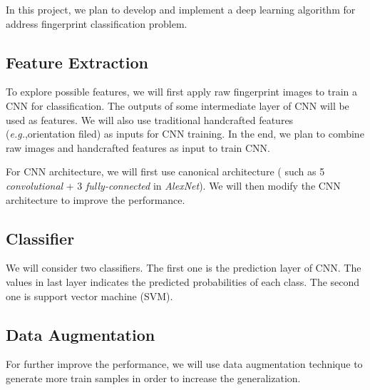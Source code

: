 
In this project, we plan to develop and implement a deep learning algorithm for address fingerprint classification problem.

\subsection{Feature Extraction}
%
To explore possible features, we will first apply raw fingerprint images to train a CNN for classification. The outputs of some intermediate layer  of CNN will be used as features.
%
We will also use traditional handcrafted features (\textit{e.g.},orientation filed) as inputs for CNN training. 
%
In the end, we plan to combine raw images and handcrafted features as input to train CNN.

For CNN architecture, we will first use canonical architecture ( such as 5 \textit{convolutional} + 3 \textit{fully-connected} in \textit{AlexNet}\cite{krizhevsky2012imagenet}). We will then modify the CNN architecture to improve the performance.
%

\subsection{Classifier}
%
We will consider two classifiers. The first one is the prediction layer of CNN. The values in last layer indicates the predicted probabilities of each class.
%
The second one is support vector machine (SVM).

\subsection{Data Augmentation}
%
For further improve the performance, we will use data augmentation technique to generate more train samples in order to increase the generalization.
